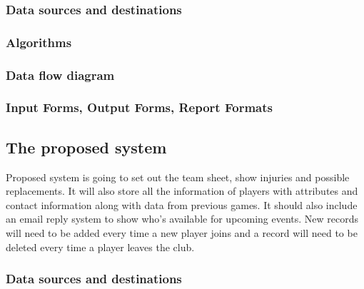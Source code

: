 \subsubsection{Data sources and destinations}

\subsubsection{Algorithms}

\subsubsection{Data flow diagram}

\subsubsection{Input Forms, Output Forms, Report Formats}

\subsection{The proposed system}
Proposed system is going to set out the team sheet, show injuries and possible replacements. It will also store all the information of players with attributes and contact information along with data from previous games. It should also include an email reply system to show who's available for upcoming events. New records will need to be added every time a new player joins and a record will need to be deleted every time a player leaves the club.

\subsubsection{Data sources and destinations}

